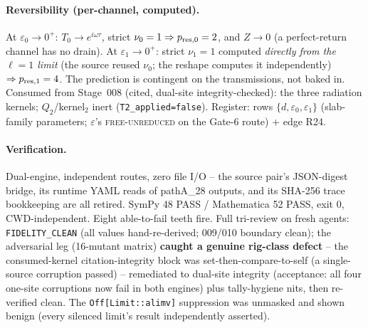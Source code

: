 \paragraph{Reversibility (per-channel, computed).}
At \(\varepsilon_0\to0^+\): \(T_0\to e^{i\omega\tau}\), strict
\(\nu_0=1\Rightarrow p_{\rm res,0}=2\), and \(Z\to0\) (a perfect-return channel
has no drain). At \(\varepsilon_1\to0^+\): strict \(\nu_1=1\) computed
\emph{directly from the \(\ell=1\) limit} (the source reused \(\nu_0\); the
reshape computes it independently) \(\Rightarrow p_{\rm res,1}=4\). The
prediction is contingent on the transmissions, not baked in. Consumed from
Stage~008 (cited, dual-site integrity-checked): the three radiation kernels;
\(Q_2\)/kernel\(_2\) inert (\texttt{T2\_applied=false}). Register: rows
\(\{d,\varepsilon_0,\varepsilon_1\}\) (slab-family parameters; \(\varepsilon\)'s
\textsc{free-unreduced} on the Gate-6 route) + edge R24.

\paragraph{Verification.}
Dual-engine, independent routes, zero file I/O -- the source pair's JSON-digest
bridge, its runtime YAML reads of pathA\_28 outputs, and its SHA-256 trace
bookkeeping are all retired. SymPy 48 PASS / Mathematica 52 PASS, exit 0,
CWD-independent. Eight able-to-fail teeth fire. Full tri-review on fresh
agents: \texttt{FIDELITY\_CLEAN} (all values hand-re-derived; 009/010 boundary
clean); the adversarial leg (16-mutant matrix) \textbf{caught a genuine
rig-class defect} -- the consumed-kernel citation-integrity block was
set-then-compare-to-self (a single-source corruption passed) -- remediated to
dual-site integrity (acceptance: all four one-site corruptions now fail in
both engines) plus tally-hygiene nits, then re-verified clean. The
\texttt{Off[Limit::alimv]} suppression was unmasked and shown benign (every
silenced limit's result independently asserted).
